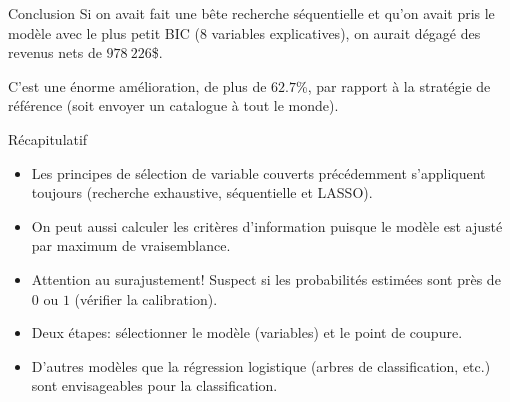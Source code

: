 \documentclass[
  ignorenonframetext,
]{beamer}
\providecommand{\tightlist}{%
  \setlength{\itemsep}{0pt}\setlength{\parskip}{0pt}}\usepackage{longtable,booktabs,array}
\begin{document}
\begin{frame}{Conclusion}
\label{conclusion}
Si on avait fait une bête recherche séquentielle et qu'on avait pris le
modèle avec le plus petit BIC (8 variables explicatives), on aurait
dégagé des revenus nets de \(978~226\)\$.

C'est une énorme amélioration, de plus de \(62.7\)\%, par rapport à la
stratégie de référence (soit envoyer un catalogue à tout le monde).
\end{frame}

\begin{frame}{Récapitulatif}
\label{ruxe9capitulatif-2}
\begin{itemize}
\tightlist
\item
  Les principes de sélection de variable couverts précédemment
  s'appliquent toujours (recherche exhaustive, séquentielle et LASSO).
\item
  On peut aussi calculer les critères d'information puisque le modèle
  est ajusté par maximum de vraisemblance.
\item
  Attention au surajustement! Suspect si les probabilités estimées sont
  près de \(0\) ou \(1\) (vérifier la calibration).
\item
  Deux étapes: sélectionner le modèle (variables) et le point de
  coupure.
\item
  D'autres modèles que la régression logistique (arbres de
  classification, etc.) sont envisageables pour la classification.
\end{itemize}
\end{frame}
\end{document}
